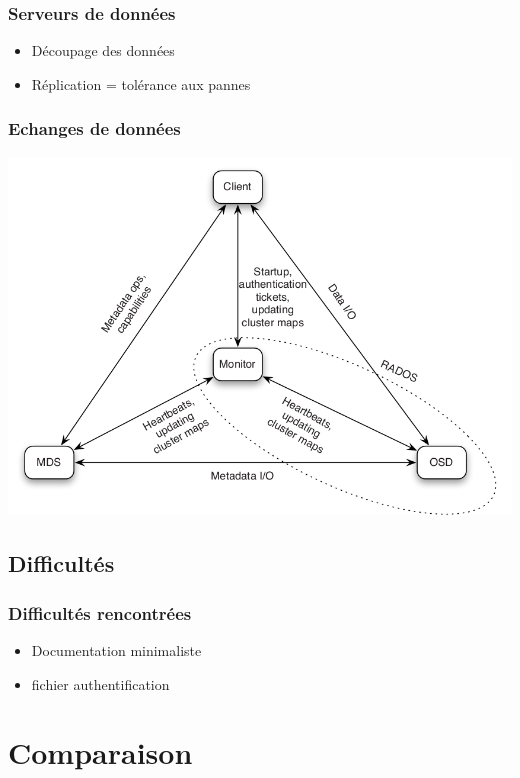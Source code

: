 \documentclass[blue]{beamer}
\begin{document}
        \begin{frame}
                \frametitle{Serveurs de données}
                \begin{itemize}
                        \item Découpage des données
                        \item Réplication = tolérance aux pannes
                \end{itemize}
        \end{frame}

        \begin{frame}
                \frametitle{Echanges de données}
                \begin{center}
	                \includegraphics[width=0.75\linewidth]{../images/Ceph_architecture2.png}
		\end{center}
        \end{frame}

        \subsection{Difficultés}
        \begin{frame}
               \frametitle{Difficultés rencontrées}
                \begin{itemize}
                        \item Documentation minimaliste
                        \item fichier authentification
                \end{itemize}
        \end{frame}

\section{Comparaison}
\end{document}
